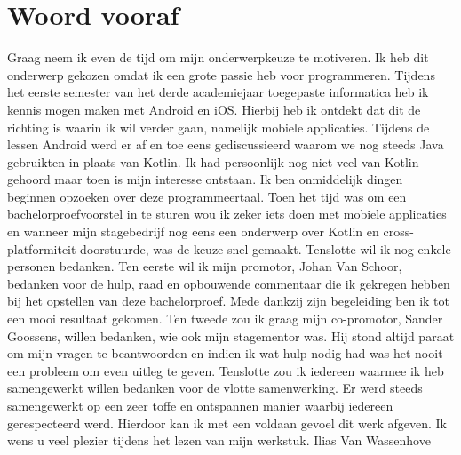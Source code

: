 
\chapter*{Woord vooraf}
\label{ch:voorwoord}

Graag neem ik even de tijd om mijn onderwerpkeuze te motiveren.
\newline
\newline
Ik heb dit onderwerp gekozen omdat ik een grote passie heb voor programmeren. Tijdens het eerste semester van het derde academiejaar toegepaste informatica heb ik kennis mogen maken met Android en iOS. Hierbij heb ik ontdekt dat dit de richting is waarin ik wil verder gaan, namelijk mobiele applicaties. Tijdens de lessen Android werd er af en toe eens gediscussieerd waarom we nog steeds Java gebruikten in plaats van Kotlin. Ik had persoonlijk nog niet veel van Kotlin gehoord maar toen is mijn interesse ontstaan. Ik ben onmiddelijk dingen beginnen opzoeken over deze programmeertaal. Toen het tijd was om een bachelorproefvoorstel in te sturen wou ik zeker iets doen met mobiele applicaties en wanneer mijn stagebedrijf nog eens een onderwerp over Kotlin en cross-platformiteit doorstuurde, was de keuze snel gemaakt.
\newline
\newline
Tenslotte wil ik nog enkele personen bedanken.
\newline
\newline
Ten eerste wil ik mijn promotor, Johan Van Schoor, bedanken voor de hulp, raad en opbouwende commentaar die ik gekregen hebben bij het opstellen van deze bachelorproef. Mede dankzij zijn begeleiding ben ik tot een mooi resultaat gekomen.
\newline
\newline
Ten tweede zou ik graag mijn co-promotor, Sander Goossens, willen bedanken, wie ook mijn stagementor was. Hij stond altijd paraat om mijn vragen te beantwoorden en indien ik wat hulp nodig had was het nooit een probleem om even uitleg te geven.
\newline
\newline
Tenslotte zou ik iedereen waarmee ik heb samengewerkt willen bedanken voor de vlotte samenwerking. Er werd steeds samengewerkt op een zeer toffe en ontspannen manier waarbij iedereen gerespecteerd werd.
\newline
\newline
Hierdoor kan ik met een voldaan gevoel dit werk afgeven. Ik wens u veel plezier tijdens het lezen van mijn werkstuk.
\newline
\newline
Ilias Van Wassenhove


